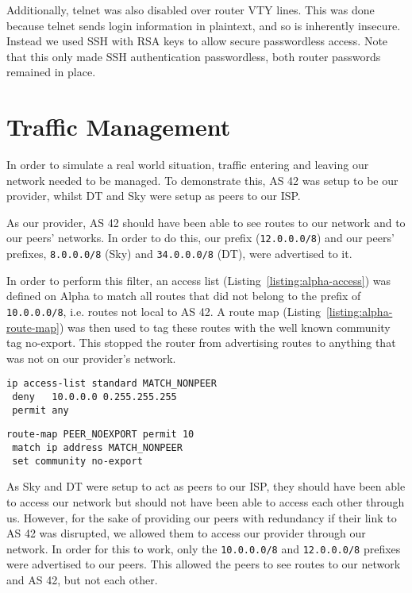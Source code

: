 Additionally, telnet was also disabled over router VTY lines. This was done
because telnet sends login information in plaintext, and so is inherently
insecure. Instead we used SSH with RSA keys to allow secure passwordless
access. Note that this only made SSH authentication passwordless, both router
passwords remained in place.

\section{Traffic Management}
In order to simulate a real world situation, traffic entering and leaving our
network needed to be managed. To demonstrate this, AS 42 was setup to
be our provider, whilst DT and Sky were setup as peers to our ISP.

As our provider, AS 42 should have been able to see routes to our network and to
our peers' networks. In order to do this, our prefix (\texttt {12.0.0.0/8}) and
our peers' prefixes, \texttt{8.0.0.0/8} (Sky) and
\texttt{34.0.0.0/8} (DT), were advertised to it.

In order to perform this filter, an access list (Listing~\ref{listing:alpha-access})
was defined on Alpha to match
all routes that did not belong to the prefix of \texttt{10.0.0.0/8}, i.e.
routes not local to AS 42. A route map (Listing~\ref{listing:alpha-route-map}) was then used to tag these routes with
the well known community tag no-export. This stopped the router from
advertising routes to anything that was not on our provider's network.

\begin{lstlisting}[caption={Alpha Access List}, label={listing:alpha-access}]
ip access-list standard MATCH_NONPEER
 deny   10.0.0.0 0.255.255.255
 permit any
\end{lstlisting}
\begin{lstlisting}[caption={Alpha Route Map}, label={listing:alpha-route-map}]
route-map PEER_NOEXPORT permit 10
 match ip address MATCH_NONPEER
 set community no-export
\end{lstlisting}

As Sky and DT were setup to act as peers to our ISP, they should have been able to
access our network but should not have been able to access each other through us. However,
for the sake of providing our peers with redundancy if their link to AS 42 was
disrupted, we allowed them to access our provider through our network. In order
for this to work, only the \texttt{10.0.0.0/8} and \texttt{12.0.0.0/8} prefixes
were advertised to our peers. This allowed the peers to see routes to our
network and AS 42, but not each other.

